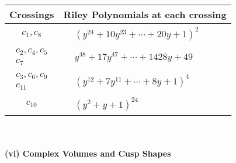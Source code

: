\documentclass[1p]{elsarticle_modified}
\theoremstyle{definition}
\begin{document}
\begin{tabular}{m{50pt}|m{274pt}}
Crossings & \hspace{64pt}Riley Polynomials at each crossing \\
\hline $$\begin{aligned}c_{1},c_{8}\end{aligned}$$&$\begin{aligned}
&(y^{24}+10 y^{23}+\cdots+20 y+1)^{2}
\end{aligned}$\\
\hline $$\begin{aligned}c_{2},c_{4},c_{5}\\c_{7}\end{aligned}$$&$\begin{aligned}
&y^{48}+17 y^{47}+\cdots+1428 y+49
\end{aligned}$\\
\hline $$\begin{aligned}c_{3},c_{6},c_{9}\\c_{11}\end{aligned}$$&$\begin{aligned}
&(y^{12}+7 y^{11}+\cdots+8 y+1)^{4}
\end{aligned}$\\
\hline $$\begin{aligned}c_{10}\end{aligned}$$&$\begin{aligned}
&(y^2+y+1)^{24}
\end{aligned}$\\
\hline
\end{tabular}\\~\\
\newpage\flushleft \textbf{(vi) Complex Volumes and Cusp Shapes}
\end{document}

